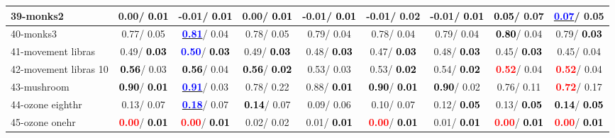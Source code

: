 \begin{table}[h]
\begin{center}
\begin{tabular}{lc|c|c|c|c|c|c|c}
39-monks2 &   0.00/\textcolor{black}{\textbf{  0.01}} &  -0.01/\textcolor{black}{\textbf{  0.01}} &   0.00/\textcolor{black}{\textbf{  0.01}} &  -0.01/\textcolor{black}{\textbf{  0.01}} &  -0.01/  0.02 &  -0.01/\textcolor{black}{\textbf{  0.01}} & \textcolor{black}{\textbf{  0.05}}/  0.07 & \underline{\textcolor{blue}{\textbf{  0.07}}}/  0.05 \\ \hline
40-monks3 &   0.77/  0.05 & \underline{\textcolor{blue}{\textbf{  0.81}}}/  0.04 &   0.78/  0.05 &   0.79/  0.04 &   0.78/  0.04 &   0.79/  0.04 & \textcolor{black}{\textbf{  0.80}}/  0.04 &   0.79/\textcolor{black}{\textbf{  0.03}} \\
41-movement libras &   0.49/\textcolor{black}{\textbf{  0.03}} & \textcolor{blue}{\textbf{  0.50}}/\textcolor{black}{\textbf{  0.03}} &   0.49/\textcolor{black}{\textbf{  0.03}} &   0.48/\textcolor{black}{\textbf{  0.03}} &   0.47/\textcolor{black}{\textbf{  0.03}} &   0.48/\textcolor{black}{\textbf{  0.03}} &   0.45/\textcolor{black}{\textbf{  0.03}} &   0.45/  0.04 \\
42-movement libras 10 & \textcolor{black}{\textbf{  0.56}}/  0.03 & \textcolor{black}{\textbf{  0.56}}/  0.04 & \textcolor{black}{\textbf{  0.56}}/\textcolor{black}{\textbf{  0.02}} &   0.53/  0.03 &   0.53/\textcolor{black}{\textbf{  0.02}} &   0.54/\textcolor{black}{\textbf{  0.02}} & \textcolor{red}{\textbf{  0.52}}/  0.04 & \textcolor{red}{\textbf{  0.52}}/  0.04 \\
43-mushroom & \textcolor{black}{\textbf{  0.90}}/\textcolor{black}{\textbf{  0.01}} & \underline{\textcolor{blue}{\textbf{  0.91}}}/  0.03 &   0.78/  0.22 &   0.88/\textcolor{black}{\textbf{  0.01}} & \textcolor{black}{\textbf{  0.90}}/\textcolor{black}{\textbf{  0.01}} & \textcolor{black}{\textbf{  0.90}}/  0.02 &   0.76/  0.11 & \textcolor{red}{\textbf{  0.72}}/  0.17 \\
44-ozone eighthr &   0.13/  0.07 & \underline{\textcolor{blue}{\textbf{  0.18}}}/  0.07 & \textcolor{black}{\textbf{  0.14}}/  0.07 &   0.09/  0.06 &   0.10/  0.07 &   0.12/\textcolor{black}{\textbf{  0.05}} &   0.13/\textcolor{black}{\textbf{  0.05}} & \textcolor{black}{\textbf{  0.14}}/\textcolor{black}{\textbf{  0.05}} \\
45-ozone onehr & \textcolor{red}{\textbf{  0.00}}/\textcolor{black}{\textbf{  0.01}} & \textcolor{red}{\textbf{  0.00}}/\textcolor{black}{\textbf{  0.01}} &   0.02/  0.02 &   0.01/\textcolor{black}{\textbf{  0.01}} & \textcolor{red}{\textbf{  0.00}}/\textcolor{black}{\textbf{  0.01}} &   0.01/\textcolor{black}{\textbf{  0.01}} & \textcolor{red}{\textbf{  0.00}}/\textcolor{black}{\textbf{  0.01}} & \textcolor{red}{\textbf{  0.00}}/\textcolor{black}{\textbf{  0.01}} \\

\end{tabular}
\end{center}
\end{table}
